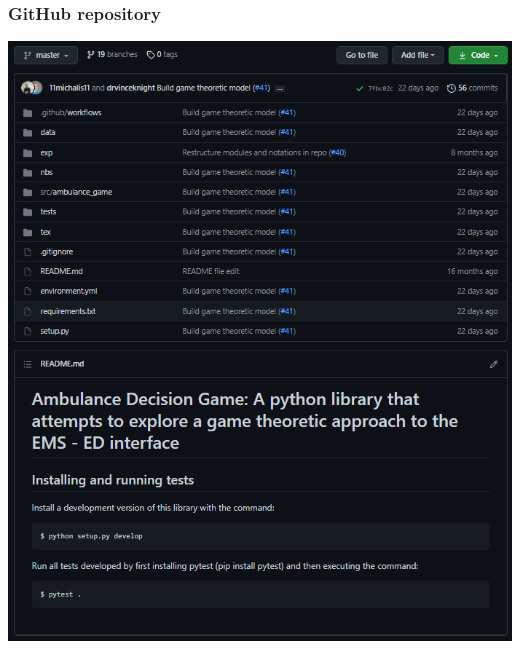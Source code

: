 \begin{frame}
    \frametitle{GitHub repository}
    \centering

    \includegraphics[scale=0.5]{Bin/github.PNG}

\end{frame}


